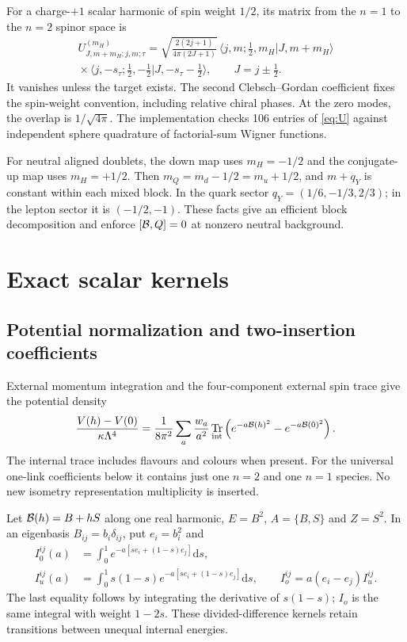 \documentclass[11pt,letterpaper]{article}
\DeclareMathOperator{\Tr}{Tr}\DeclareMathOperator{\diag}{diag}
\newcommand{\dd}{\mathrm d}\newcommand{\Lam}{\Lambda}
\begin{document}
For a charge-$+1$ scalar harmonic of spin weight $1/2$, its matrix from the $n=1$ to the $n=2$ spinor space is
\begin{multline}
 U^{(m_H)}_{J,m+m_H;j,m;\tau}
 =\sqrt{\frac{2(2j+1)}{4\pi(2J+1)}}\,
 \langle j,m;\tfrac12,m_H|J,m+m_H\rangle\\
 {}
 \times\langle j,-s_\tau;\tfrac12,-\tfrac12|J,-s_\tau-\tfrac12\rangle,
 \qquad J=j\pm\tfrac12 .\label{eq:U}
\end{multline}
It vanishes unless the target exists. The second Clebsch--Gordan coefficient fixes the spin-weight convention, including relative chiral phases. At the zero modes, the overlap is $1/\sqrt{4\pi}$. The implementation checks 106 entries of \eqref{eq:U} against independent sphere quadrature of factorial-sum Wigner functions.

For neutral aligned doublets, the down map uses $m_H=-1/2$ and the conjugate-up map uses $m_H=+1/2$. Then $m_Q=m_d-1/2=m_u+1/2$, and $m+q_Y$ is constant within each mixed block. In the quark sector $q_Y=(1/6,-1/3,2/3)$; in the lepton sector it is $(-1/2,-1)$. These facts give an efficient block decomposition and enforce $[\mathcal B,Q]=0$ at nonzero neutral background.

\section{Exact scalar kernels}

\subsection{Potential normalization and two-insertion coefficients}

External momentum integration and the four-component external spin trace give the potential density
\begin{equation}
 \frac{V(h)-V(0)}{\kappa\Lam^4}
 =\frac1{8\pi^2}\sum_a\frac{w_a}{a^2}
 \Tr_{\rm int}\left(e^{-a\B(h)^2}-e^{-a\B(0)^2}\right).
 \label{eq:potential}
\end{equation}
The internal trace includes flavours and colours when present. For the universal one-link coefficients below it contains just one $n=2$ and one $n=1$ species. No new isometry representation multiplicity is inserted.

Let $\mathcal B(h)=B+hS$ along one real harmonic, $E=B^2$, $A=\{B,S\}$ and $Z=S^2$. In an eigenbasis $B_{ij}=b_i\delta_{ij}$, put $e_i=b_i^2$ and
\begin{align}
 I_0^{ij}(a)&=\int_0^1e^{-a[se_i+(1-s)e_j]}\dd s,\\
 I_u^{ij}(a)&=\int_0^1s(1-s)e^{-a[se_i+(1-s)e_j]}\dd s,\qquad
 I_o^{ij}=a(e_i-e_j)I_u^{ij}.\label{eq:moments}
\end{align}
The last equality follows by integrating the derivative of $s(1-s)$; $I_o$ is the same integral with weight $1-2s$. These divided-difference kernels retain transitions between unequal internal energies.
\end{document}
